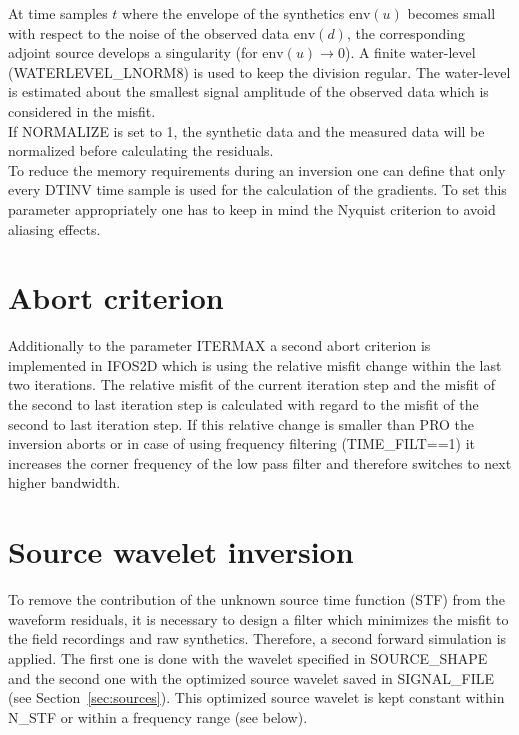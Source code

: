 At time samples $t$ where the envelope of the synthetics $\text{env}( u)$ becomes small with respect to the noise of the observed data $\text{env}( d)$, the corresponding adjoint source develops a singularity (for $\text{env}( u) \rightarrow 0$). A finite water-level (WATERLEVEL\_LNORM8) is used to keep the division regular. The water-level is estimated about the smallest signal amplitude of the observed data which is considered in the misfit.\\
If NORMALIZE is set to 1, the synthetic data and the measured data will be normalized before calculating the residuals.\\

To reduce the memory requirements during an inversion one can define that only every DTINV time sample is used for the calculation of the gradients. To set this parameter appropriately one has to keep in mind the Nyquist criterion to avoid aliasing effects.


\section{Abort criterion}
\label{json:abort_criterion}
{\color{blue}{\begin{verbatim}
"Termination of the programmme" : "comment",
			"PRO" : "0.01",
\end{verbatim}}}
Additionally to the parameter ITERMAX a second abort criterion is implemented in IFOS2D which is using the relative misfit change within the last two iterations. The relative misfit of
the current iteration step and the misfit of the second to last iteration step is calculated with regard to the misfit of the second to last iteration step. If this relative change is
smaller than PRO the inversion aborts or in case of using frequency filtering (TIME\_FILT==1) it increases the corner frequency of the low pass filter and therefore switches to next higher bandwidth. 

\newpage

\section{Source wavelet inversion}
\label{sec:STF}
To remove the contribution of the unknown source time function (STF) from the waveform residuals, it is necessary to design a filter which minimizes the misfit to the field recordings and raw synthetics. Therefore, a second forward simulation is applied. The first one is done with the wavelet specified in SOURCE\_SHAPE and the second one with the optimized source wavelet saved in SIGNAL\_FILE (see Section~\ref{sec:sources}). This optimized source wavelet is kept constant within N\_STF or within a frequency range (see below).\\

